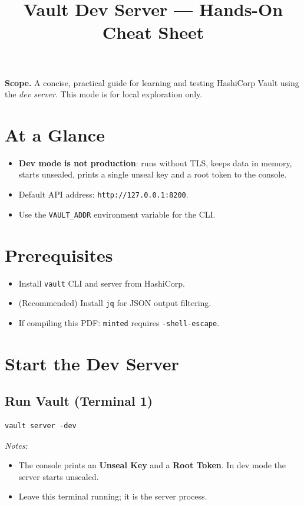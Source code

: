\documentclass[11pt]{article}
\title{\textbf{Vault Dev Server --- Hands-On Cheat Sheet}}
\author{}
\date{}
\begin{document}
\maketitle

\textbf{Scope.} A concise, practical guide for learning and testing HashiCorp Vault using the \emph{dev server}. This mode is for local exploration only.

\section*{At a Glance}
\begin{itemize}[nosep]
  \item \textbf{Dev mode is not production}: runs without TLS, keeps data in memory, starts unsealed, prints a single unseal key and a root token to the console.
  \item Default API address: \texttt{http://127.0.0.1:8200}.
  \item Use the \texttt{VAULT\_ADDR} environment variable for the CLI.
\end{itemize}

\section{Prerequisites}
\begin{itemize}[itemsep=2pt]
  \item Install \texttt{vault} CLI and server from HashiCorp.
  \item (Recommended) Install \texttt{jq} for JSON output filtering.
  \item If compiling this PDF: \texttt{minted} requires \texttt{-shell-escape}.
\end{itemize}

\section{Start the Dev Server}
\subsection{Run Vault (Terminal 1)}
\begin{verbatim}
vault server -dev
\end{verbatim}

\textit{Notes:}
\begin{itemize}[nosep]
  \item The console prints an \textbf{Unseal Key} and a \textbf{Root Token}. In dev mode the server starts unsealed.
  \item Leave this terminal running; it is the server process.
\end{itemize}
\end{document}
